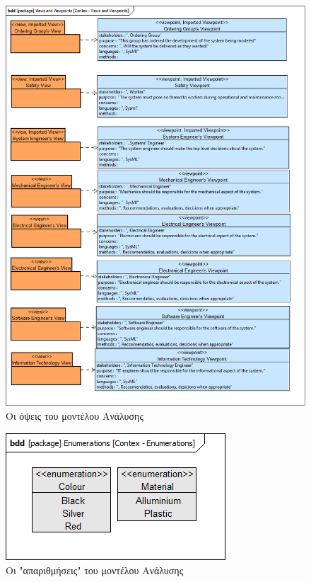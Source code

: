 \documentclass[a4paper,12pt,twoside]{report}
\begin{document}
{\begin{appendices}
				\begin{figure}[hp]
					\centering
					\includegraphics[scale=0.30]{AnalysisModel_Contex-ViewsandViewpoints.png}
					\caption{Οι όψεις του μοντέλου Ανάλυσης}
					\label{φωτ:Οι όψεις του μοντέλου Ανάλυσης}
				\end{figure}
				
				\begin{figure}[hp]
					\centering
					\includegraphics[scale=0.50]{AnalysisModel_Contex-Enumerations.png}
					\caption{Οι "απαριθμήσεις" του μοντέλου Ανάλυσης}
					\label{φωτ:Οι "απαριθμήσεις" του μοντέλου Ανάλυσης}
				\end{figure}		


\end{appendices}}
\end{document}
